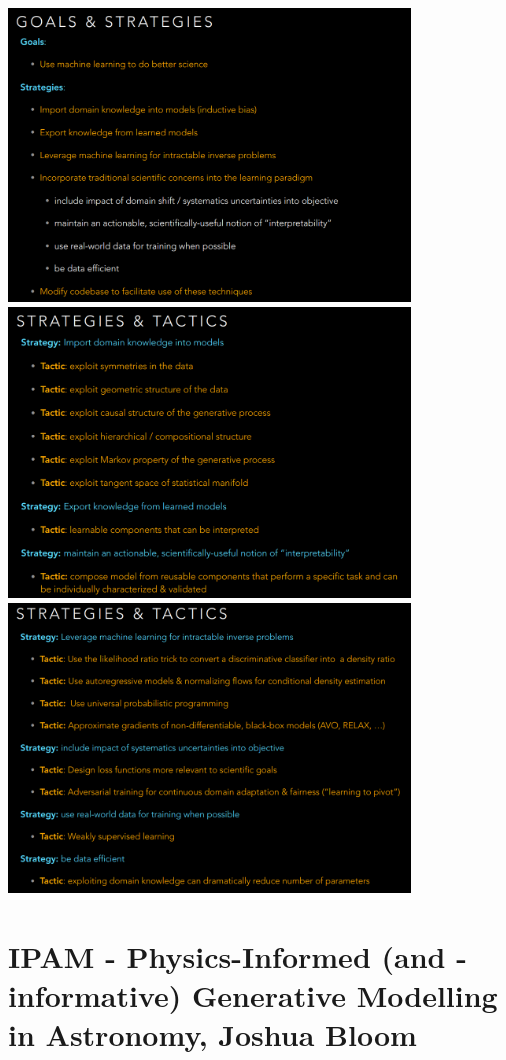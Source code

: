 \documentclass{article}
\begin{document}
\begin{center}
\includegraphics[width=0.8\textwidth]{images/goals-1.png}
\includegraphics[width=0.8\textwidth]{images/goals-2.png}
\includegraphics[width=0.8\textwidth]{images/goals-3.png}
\end{center}

\section{IPAM - Physics-Informed (and -informative) Generative Modelling in Astronomy, Joshua Bloom}
\end{document}
